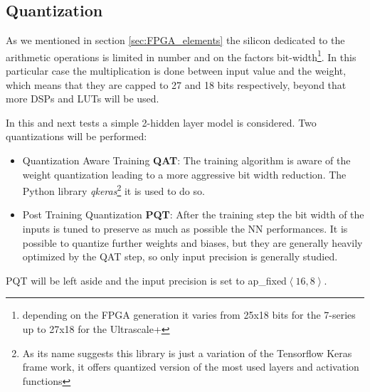 \documentclass[../../main.tex]{subfiles}
\begin{document}
\subsection{Quantization}
\label{sec:P2GT_Comp}

As we mentioned in section \ref{sec:FPGA_elements} the silicon dedicated to the arithmetic operations is limited in number and on the factors bit-width\footnote{depending on the FPGA generation it varies from 25x18 bits for the 7-series up to 27x18 for the Ultrascale+}.  
In this particular case the multiplication is done between input value and the weight, which means that they are capped to 27 and 18 bits respectively, beyond that more DSPs and LUTs will be used.   

In this and next tests a simple 2-hidden layer model is considered. Two quantizations will be performed:
\begin{itemize}
    \item Quantization Aware Training \textbf{QAT}: The training algorithm is aware of the weight quantization leading to a more aggressive bit width reduction. The Python library \textit{qkeras}\cite{qkeras}\footnote{As its name suggests this library is just a variation of the Tensorflow Keras frame work, it offers quantized version of the most used layers and activation functions} it is used to do so.
    \item Post Training Quantization \textbf{PQT}: After the training step the bit width of the inputs is tuned to preserve as much as possible the NN performances. It is possible to quantize further weights and biases, but they are generally heavily optimized by the QAT step, so only input precision is generally studied.
\end{itemize}

PQT will be left aside and the input precision is set to ap\_fixed$\left<16,8\right>$.
\end{document}
